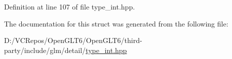 Definition at line 107 of file type\+\_\+int.\+hpp.



The documentation for this struct was generated from the following file\+:\begin{DoxyCompactItemize}
\item 
D\+:/\+V\+C\+Repos/\+Open\+G\+L\+T6/\+Open\+G\+L\+T6/third-\/party/include/glm/detail/\mbox{\hyperlink{type__int_8hpp}{type\+\_\+int.\+hpp}}\end{DoxyCompactItemize}
